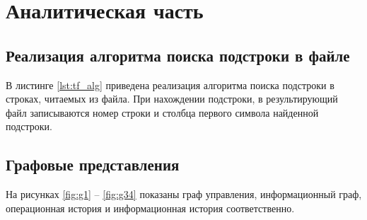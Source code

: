 \chapter{Аналитическая часть}

\section{Реализация алгоритма поиска подстроки в файле}

В листинге \ref{lst:tf_alg} приведена реализация алгоритма поиска подстроки в строках, читаемых из файла.
При нахождении подстроки, в результирующий файл записываются номер строки и столбца первого символа найденной подстроки.

\clearpage



\section{Графовые представления}

На рисунках \ref{fig:g1} -- \ref{fig:g34} показаны граф управления, информационный граф, операционная история и информационная история соответственно.

